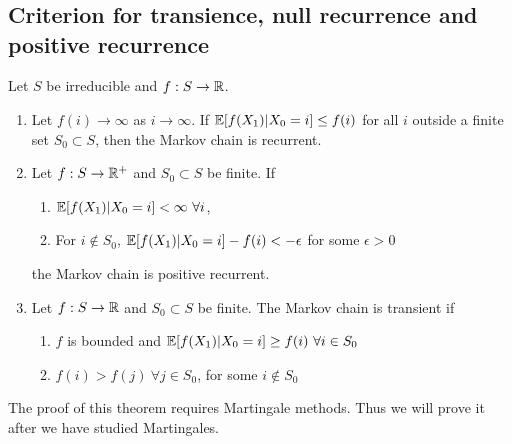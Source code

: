\documentclass[all-lectures.tex]{subfiles}
\begin{document}

\setcounter{section}{4}
\setcounter{subsection}{0}

\section*{}
\subsection{Criterion for transience, null recurrence and positive recurrence}
\begin{thm} \label{prop:markov_chain_class_tests}
Let $S$ be irreducible and $f: S \rightarrow \mathbb{R}$. 
\begin{enumerate}
\item Let $f(i)\rightarrow \infty$ as $i\rightarrow \infty$. If $\mathbb{E}[f(X_1)|X_0 = i] \leq f(i)$ for all $i$ outside a finite set $S_0 \subset S$, then the Markov chain is recurrent. 
\item Let $f:S\rightarrow \mathbb{R}^+$ and $S_0 \subset S$ be finite. If 
	\begin{enumerate}
	\item  $\E[f(X_1)|X_0 = i] < \infty \ \forall i$,
	\item For $i \notin S_0$, $\mathbb{E}[f(X_1)|X_0 = i] - f(i) < -\epsilon$ for some $\epsilon > 0$
	\end{enumerate}
	 the Markov chain is positive recurrent. 
\item Let $f:S\rightarrow \mathbb{R}$ and $S_0 \subset S$ be finite.	The Markov chain is transient if
	\begin{enumerate}
	\item  $f$ is bounded and $\E[f(X_1)|X_0= i] \geq f(i)\ \forall i \in S_0$
	\item $f(i) > f(j)\ \forall j\in S_0$, for some $i\notin S_0$
	\end{enumerate}	
\end{enumerate}
\end{thm}
\indent The proof of this theorem requires Martingale methods. Thus we will prove it after we have studied Martingales. \\
\end{document}
